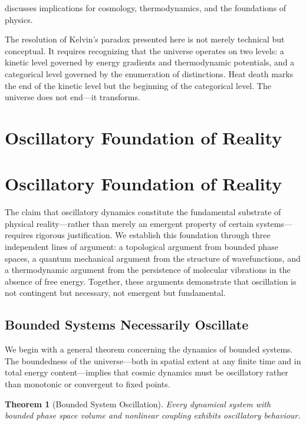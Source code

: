\documentclass[12pt,a4paper]{article}
\newtheorem{theorem}{Theorem}[section]
\theoremstyle{definition}
\theoremstyle{remark}
\begin{document}
discusses implications for cosmology, thermodynamics, and the foundations of physics.

The resolution of Kelvin's paradox presented here is not merely technical but conceptual. It requires recognizing that the universe operates on two levels: a kinetic level governed by energy gradients and thermodynamic potentials, and a categorical level governed by the enumeration of distinctions. Heat death marks the end of the kinetic level but the beginning of the categorical level. The universe does not end—it transforms.


\section{Oscillatory Foundation of Reality}
\label{sec:oscillatory}
\section{Oscillatory Foundation of Reality}
\label{sec:oscillatory}

The claim that oscillatory dynamics constitute the fundamental substrate of physical reality—rather than merely an emergent property of certain systems—requires rigorous justification. We establish this foundation through three independent lines of argument: a topological argument from bounded phase spaces, a quantum mechanical argument from the structure of wavefunctions, and a thermodynamic argument from the persistence of molecular vibrations in the absence of free energy. Together, these arguments demonstrate that oscillation is not contingent but necessary, not emergent but fundamental.

\subsection{Bounded Systems Necessarily Oscillate}

We begin with a general theorem concerning the dynamics of bounded systems. The boundedness of the universe—both in spatial extent at any finite time and in total energy content—implies that cosmic dynamics must be oscillatory rather than monotonic or convergent to fixed points.

\begin{theorem}[Bounded System Oscillation]
\label{thm:bounded_oscillation}
Every dynamical system with bounded phase space volume and nonlinear coupling exhibits oscillatory behaviour.
\end{theorem}
\end{document}

